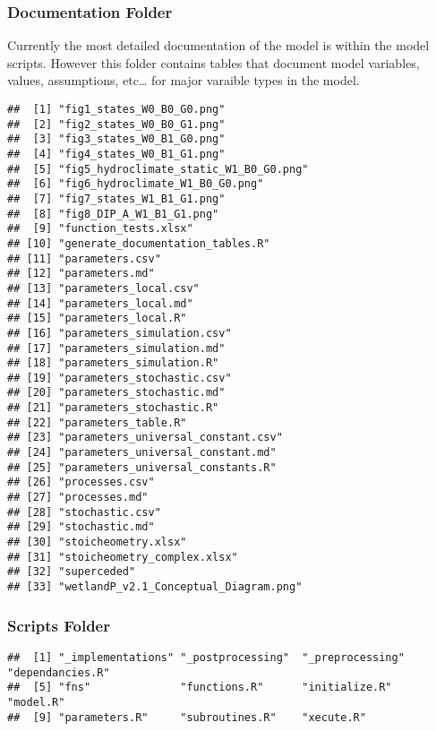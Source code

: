 \documentclass[
]{article}
\begin{document}
\hypertarget{documentation-folder}{%
\subsubsection{Documentation Folder}\label{documentation-folder}}

Currently the most detailed documentation of the model is within the
model scripts. However this folder contains tables that document model
variables, values, assumptions, etc\ldots{} for major varaible types in
the model.

\begin{verbatim}
##  [1] "fig1_states_W0_B0_G0.png"             
##  [2] "fig2_states_W0_B0_G1.png"             
##  [3] "fig3_states_W0_B1_G0.png"             
##  [4] "fig4_states_W0_B1_G1.png"             
##  [5] "fig5_hydroclimate_static_W1_B0_G0.png"
##  [6] "fig6_hydroclimate_W1_B0_G0.png"       
##  [7] "fig7_states_W1_B1_G1.png"             
##  [8] "fig8_DIP_A_W1_B1_G1.png"              
##  [9] "function_tests.xlsx"                  
## [10] "generate_documentation_tables.R"      
## [11] "parameters.csv"                       
## [12] "parameters.md"                        
## [13] "parameters_local.csv"                 
## [14] "parameters_local.md"                  
## [15] "parameters_local.R"                   
## [16] "parameters_simulation.csv"            
## [17] "parameters_simulation.md"             
## [18] "parameters_simulation.R"              
## [19] "parameters_stochastic.csv"            
## [20] "parameters_stochastic.md"             
## [21] "parameters_stochastic.R"              
## [22] "parameters_table.R"                   
## [23] "parameters_universal_constant.csv"    
## [24] "parameters_universal_constant.md"     
## [25] "parameters_universal_constants.R"     
## [26] "processes.csv"                        
## [27] "processes.md"                         
## [28] "stochastic.csv"                       
## [29] "stochastic.md"                        
## [30] "stoicheometry.xlsx"                   
## [31] "stoicheometry_complex.xlsx"           
## [32] "superceded"                           
## [33] "wetlandP_v2.1_Conceptual_Diagram.png"
\end{verbatim}

\hypertarget{scripts-folder}{%
\subsubsection{Scripts Folder}\label{scripts-folder}}

\begin{verbatim}
##  [1] "_implementations" "_postprocessing"  "_preprocessing"   "dependancies.R"  
##  [5] "fns"              "functions.R"      "initialize.R"     "model.R"         
##  [9] "parameters.R"     "subroutines.R"    "xecute.R"
\end{verbatim}
\end{document}
